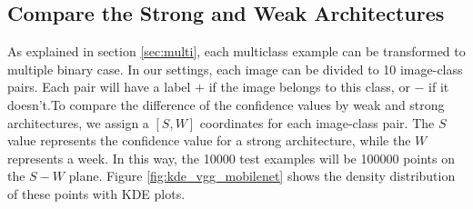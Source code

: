 \documentclass{article}
\begin{document}
\subsection{Compare the Strong and Weak Architectures}
As explained in section \ref{sec:multi}, each multiclass example can be transformed to multiple binary case. In our settings, each image can be divided to 10 image-class pairs. Each pair will have a label $+$ if the image belongs to this class, or $-$ if it doesn't.To compare the difference of the confidence values by weak and strong architectures, we assign a $\left[S,W\right]$ coordinates for each image-class pair. The $S$ value represents the confidence value for a strong architecture, while the $W$ represents a week. In this way, the 10000 test examples will be 100000 points on the $S-W$ plane. Figure \ref{fig:kde_vgg_mobilenet} shows the density distribution of these points with KDE plots.
\end{document}
